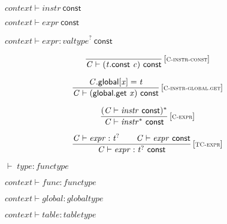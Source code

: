 \vspace{1ex}

$\boxed{{\mathit{context}} \vdash {\mathit{instr}}~\mathsf{const}}$

$\boxed{{\mathit{context}} \vdash {\mathit{expr}}~\mathsf{const}}$

$\boxed{{\mathit{context}} \vdash {\mathit{expr}} : {{\mathit{valtype}}^?}~\mathsf{const}}$

$$
\begin{array}{@{}c@{}}\displaystyle
\frac{
}{
{\mathit{C}} \vdash ({\mathit{t}}.\mathsf{const}~{\mathit{c}})~\mathsf{const}
} \, {[\textsc{\scriptsize C{-}instr{-}const}]}
\qquad
\end{array}
$$

$$
\begin{array}{@{}c@{}}\displaystyle
\frac{
{\mathit{C}}.\mathsf{global}{}[{\mathit{x}}] = {\mathit{t}}
}{
{\mathit{C}} \vdash (\mathsf{global.get}~{\mathit{x}})~\mathsf{const}
} \, {[\textsc{\scriptsize C{-}instr{-}global.get}]}
\qquad
\end{array}
$$

\vspace{1ex}

$$
\begin{array}{@{}c@{}}\displaystyle
\frac{
({\mathit{C}} \vdash {\mathit{instr}}~\mathsf{const})^\ast
}{
{\mathit{C}} \vdash {{\mathit{instr}}^\ast}~\mathsf{const}
} \, {[\textsc{\scriptsize C{-}expr}]}
\qquad
\end{array}
$$

\vspace{1ex}

$$
\begin{array}{@{}c@{}}\displaystyle
\frac{
{\mathit{C}} \vdash {\mathit{expr}} : {{\mathit{t}}^?}
 \qquad
{\mathit{C}} \vdash {\mathit{expr}}~\mathsf{const}
}{
{\mathit{C}} \vdash {\mathit{expr}} : {{\mathit{t}}^?}~\mathsf{const}
} \, {[\textsc{\scriptsize TC{-}expr}]}
\qquad
\end{array}
$$

\vspace{1ex}

$\boxed{{ \vdash }\;{\mathit{type}} : {\mathit{functype}}}$

$\boxed{{\mathit{context}} \vdash {\mathit{func}} : {\mathit{functype}}}$

$\boxed{{\mathit{context}} \vdash {\mathit{global}} : {\mathit{globaltype}}}$

$\boxed{{\mathit{context}} \vdash {\mathit{table}} : {\mathit{tabletype}}}$

